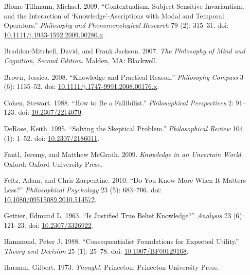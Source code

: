 \documentclass[
  10pt,
  letterpaper,
  DIV=11,
  numbers=noendperiod,
  twoside]{scrartcl}
\newlength{\cslhangindent}
\newenvironment{CSLReferences}[2] %
 {\begin{list}{}{%
  \setlength{\itemindent}{0pt}
  \setlength{\leftmargin}{0pt}
  \setlength{\parsep}{0pt}
  \ifodd #1
   \setlength{\leftmargin}{\cslhangindent}
   \setlength{\itemindent}{-1\cslhangindent}
  \fi
  \setlength{\itemsep}{#2\baselineskip}}}
 {\end{list}}
\begin{document}
\label{refs}
\begin{CSLReferences}{1}{0}
Blome-Tillmann, Michael. 2009. {``Contextualism, Subject-Sensitive
Invariantism, and the Interaction of {`Knowledge'}-Ascriptions with
Modal and Temporal Operators.''} \emph{Philosophy and Phenomenological
Research} 79 (2): 315--31. doi:
\href{https://doi.org/10.1111/j.1933-1592.2009.00280.x}{10.1111/j.1933-1592.2009.00280.x}.

Braddon-Mitchell, David, and Frank Jackson. 2007. \emph{The Philosophy
of Mind and Cognition, {Second Edition}}. Malden, MA: Blackwell.

Brown, Jessica. 2008. {``Knowledge and Practical Reason.''}
\emph{Philosophy Compass} 3 (6): 1135--52. doi:
\href{https://doi.org/10.1111/j.1747-9991.2008.00176.x}{10.1111/j.1747-9991.2008.00176.x}.

Cohen, Stewart. 1988. {``How to Be a Fallibilist.''} \emph{Philosophical
Perspectives} 2: 91--123. doi:
\href{https://doi.org/10.2307/2214070}{10.2307/2214070}.

DeRose, Keith. 1995. {``Solving the Skeptical Problem.''}
\emph{Philosophical Review} 104 (1): 1--52. doi:
\href{https://doi.org/10.2307/2186011}{10.2307/2186011}.

Fantl, Jeremy, and Matthew McGrath. 2009. \emph{Knowledge in an
Uncertain World}. Oxford: Oxford University Press.

Feltz, Adam, and Chris Zarpentine. 2010. {``Do You Know More When It
Matters Less?''} \emph{Philosophical Psychology} 23 (5): 683--706. doi:
\href{https://doi.org/10.1080/09515089.2010.514572}{10.1080/09515089.2010.514572}.

Gettier, Edmund L. 1963. {``Is Justified True Belief Knowledge?''}
\emph{Analysis} 23 (6): 121--23. doi:
\href{https://doi.org/10.2307/3326922}{10.2307/3326922}.

Hammond, Peter J. 1988. {``Consequentialist Foundations for Expected
Utility.''} \emph{Theory and Decision} 25 (1): 25--78. doi:
\href{https://doi.org/10.1007/BF00129168}{10.1007/BF00129168}.

Harman, Gilbert. 1973. \emph{Thought}. Princeton: Princeton University
Press.


\end{CSLReferences}
\end{document}
